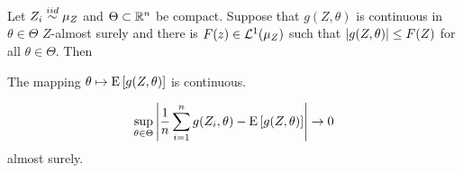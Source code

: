 \begin{theorem}
    Let $Z_i\overset{iid}{\sim}\mu_Z$ and $\Theta\subset\mathbb{R}^n$ be  
    compact. Suppose that $g(Z,\theta)$ is continuous in $\theta\in\Theta$ 
    $Z$-almost surely and there is $F(z)\in\mathcal{L}^1(\mu_Z)$ such that 
    $\left\lvert {g(Z,\theta)} \right\rvert\leq F(Z)$ for all $\theta\in\Theta$. Then 
    \begin{thmenum}
        \item The mapping $\theta\mapsto\operatorname{E}\left[ {g(Z,\theta)} \right]$ is 
        continuous. 
        \item \begin{equation*}
            \sup_{\theta\in\Theta}\left\lvert {\frac{1}{n}\sum_{i=1}^ng(Z_i,\theta) - \operatorname{E}\left[ {g(Z,\theta)} \right]} \right\rvert\to 0
        \end{equation*}
        almost surely. 
    \end{thmenum} 
\end{theorem}
